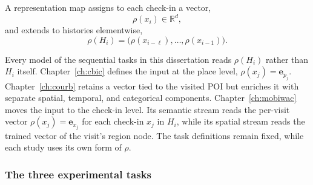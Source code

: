 \begin{definition}\label{def:fund:repmap}
    A representation map assigns to each check-in a vector,
    \begin{equation}
        \rho(x_i)\in\mathbb{R}^{d},
    \end{equation}
    and extends to histories elementwise,
    \begin{equation}
        \rho(H_i)=\bigl(\rho(x_{i-\ell}),\ldots,\rho(x_{i-1})\bigr).
    \end{equation}
\end{definition}

Every model of the sequential tasks in this dissertation reads $\rho(H_i)$ rather than
$H_i$ itself. Chapter~\ref{ch:cbic} defines the input at the place level,
$\rho(x_j)=\mathbf{e}_{p_j}$. Chapter~\ref{ch:courb} retains a vector tied to the visited
POI but enriches it with separate spatial, temporal, and categorical components.
Chapter~\ref{ch:mobiwac} moves the input to the check-in level. Its semantic stream reads
the per-visit vector $\rho(x_j)=\mathbf{e}_{x_j}$ for each check-in $x_j$ in $H_i$, while
its spatial stream reads the trained vector of the visit's region node. The task definitions remain fixed, while
each study uses its own form of $\rho$.

\subsubsection{The three experimental tasks}

